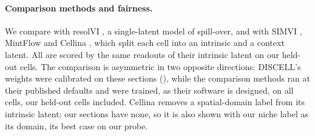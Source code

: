 \paragraph{Comparison methods and fairness.}
We compare with resolVI \citep{ergen2026resolvi}, a single-latent model of spill-over, and with SIMVI \citep{dong2025simvi}, MintFlow \citep{akbarnejad2025mintflow} and Cellina \citep{moeed2026cellina}, which split each cell into an intrinsic and a context latent. All are scored by the same readouts of their intrinsic latent on our held-out cells. The comparison is asymmetric in two opposite directions: DISCELL's weights were calibrated on these sections (), while the comparison methods ran at their published defaults and were trained, as their software is designed, on all cells, our held-out cells included. Cellina removes a spatial-domain label from its intrinsic latent; our sections have none, so it is also shown with our niche label as its domain, its best case on our probe.
